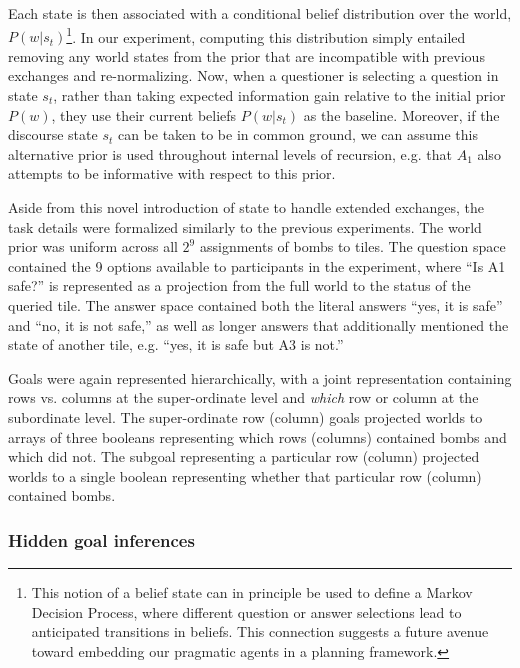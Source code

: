 \documentclass[11pt, floatsintext]{apa6}
\begin{document}
Each state is then associated with a conditional belief distribution over the world, $P(w | s_t)$\footnote{This notion of a belief state can in principle be used to define a Markov Decision Process, where different question or answer selections lead to anticipated transitions in beliefs. This connection suggests a future avenue toward embedding our pragmatic agents in a planning framework.}.
In our experiment, computing this distribution simply entailed removing any world states from the prior that are incompatible with previous exchanges and re-normalizing.
Now, when a questioner is selecting a question in state $s_t$, rather than taking expected information gain relative to the initial prior $P(w)$, they use their current beliefs $P(w | s_t)$ as the baseline.
Moreover, if the discourse state $s_t$ can be taken to be in common ground, we can assume this alternative prior is used throughout internal levels of recursion, e.g. that $A_1$ also attempts to be informative with respect to this prior.

Aside from this novel introduction of state to handle extended exchanges, the task details were formalized similarly to the previous experiments.
The world prior was uniform across all $2^9$ assignments of bombs to tiles. 
The question space contained the 9 options available to participants in the experiment, where ``Is A1 safe?'' is represented as a projection from the full world to the status of the queried tile. 
The answer space contained both the literal answers ``yes, it is safe'' and ``no, it is not safe,'' as well as longer answers that additionally mentioned the state of another tile, e.g. ``yes, it is safe but A3 is not.''

Goals were again represented hierarchically, with a joint representation containing rows vs. columns at the super-ordinate level and \emph{which} row or column at the subordinate level.
The super-ordinate row (column) goals projected worlds to arrays of three booleans representing which rows (columns) contained bombs and which did not.
The subgoal representing a particular row (column) projected worlds to a single boolean representing whether that particular row (column) contained bombs.

\subsubsection{Hidden goal inferences}
\end{document}
